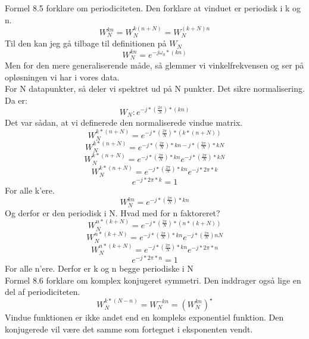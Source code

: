 \begin{Opgaver}
\begin{kapitel}
\begin{Opgave}
\begin{UnderOpgave}[For the choice of \text{$a = 0.54, b = 0.23$} and using ICTFT show that the resulting
                Hamming window function is given by eq. 7.191]
            \end{UnderOpgave}
        \end{Opgave}
    \end{kapitel}
    \begin{kapitel}
        \begin{Opgave}
            \begin{UnderOpgave}
                Formel 8.5 forklare om periodiciteten. Den forklare at vinduet er periodisk i k og n. 
                \[W_{N}^{kn} = W_{N}^{k(n+N)}=W_{N}^{(k+N)n}\]
                Til den kan jeg gå tilbage til definitionen på $W_N$ 
                \[W_N^{kn} = e^{-j\omega_0 * (kn)}\]
                Men for den mere generaliserende måde, så glemmer vi vinkelfrekvensen og ser på opløsningen vi har i vores data.\\
                For N datapunkter, så deler vi spektret ud på N punkter. Det sikre normalisering. Da er: 
                \[W_N : e^{-j * (\frac{2\pi}{N}) * (kn)}\]
                Det var sådan, at vi definerede den normaliserede vindue matrix. 
                \[W_N^{k*(n + N)} = e^{-j * (\frac{2\pi}{N}) * (k*(n + N))}\]
                \[W_N^{k*(n + N)} = e^{-j * (\frac{2\pi}{N}) * kn  -j * (\frac{2\pi}{N}) * kN}\]
                \[W_N^{k*(n + N)} = e^{-j * (\frac{2\pi}{N}) * kn}e^{-j * (\frac{2\pi}{N}) * kN}\]
                \[W_N^{k*(n + N)} = e^{-j * (\frac{2\pi}{N}) * kn}e^{-j * 2\pi * k}\]
                \[e^{-j * 2\pi * k} = 1\]
                For alle k'ere. 
                \[W_N^{kn} = e^{-j * (\frac{2\pi}{N}) * kn}\]
                Og derfor er den periodisk i N.
                Hvad med for n faktoreret? 
                \[W_N^{n*(k + N)} = e^{-j * (\frac{2\pi}{N}) * (n*(k + N))}\]
                \[W_N^{n*(k + N)} = e^{-j * (\frac{2\pi}{N}) * kn}e^{-j * (\frac{2\pi}{N})nN}\]
                \[W_N^{n*(k + N)} = e^{-j * (\frac{2\pi}{N}) * kn}e^{-j * 2\pi * n}\]
                \[e^{-j * 2\pi * n} = 1\]
                For alle n'ere.
                Derfor er k og n begge periodiske i N
                \vspace{40pt}\\
                Formel 8.6 forklare om komplex konjugeret symmetri. Den inddrager også lige en del af periodiciteten. 
                \[W_N^{k*(N - n)} = W_N^{-kn} = (W_N^{kn})^\star\]
                Vindue funktionen er ikke andet end en kompleks exponentiel funktion. Den konjugerede vil være det samme som fortegnet i eksponenten vendt. 

\end{UnderOpgave}
\end{Opgave}
\end{kapitel}
\end{Opgaver}
